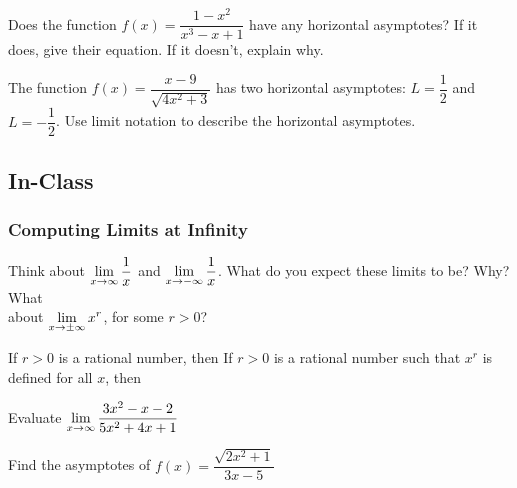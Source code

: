 \documentclass[notes]{subfiles}
\begin{document}
		\begin{ex}
			Does the function $f(x) = \dfrac{1-x^2}{x^3-x+1}$ have any horizontal asymptotes?  If it does, give their equation.  If it doesn't, explain why.
		\end{ex}
			
		\begin{ex}
			The function $f(x) = \dfrac{x-9}{\sqrt{4x^2 + 3}}$ has two horizontal asymptotes: $L = \dfrac{1}{2}$ and $L = - \dfrac{1}{2}$.  Use limit notation to describe the horizontal asymptotes.
		\end{ex}
			\newpage
	
	\subsection*{In-Class}		
	\subsubsection*{Computing Limits at Infinity}
		\begin{question}
			Think about $\displaystyle \lim_{x\to\infty} \dfrac{1}{x}$ and $\displaystyle \lim_{x\to -\infty} \dfrac{1}{x}$.  What do you expect these limits to be?  Why?  What\\[5pt] about $\displaystyle \lim_{x\to \pm \infty} x^r$, for some $r > 0$?
		\end{question}
			
		\begin{rmk}[Theorem]
			If $r > 0$ is a rational number, then 
			If $r > 0$ is a rational number such that $x^r$ is defined for all $x$, then
		\end{rmk}
		
		\begin{ex}
			Evaluate $\displaystyle \lim_{x\to \infty} \dfrac{3x^2-x-2}{5x^2+4x+1}$
		\end{ex}
			\newpage
			
		\begin{ex}
			Find the asymptotes of $f(x) = \dfrac{\sqrt{2x^2+1}}{3x-5}$
		\end{ex}
			
\end{document}
